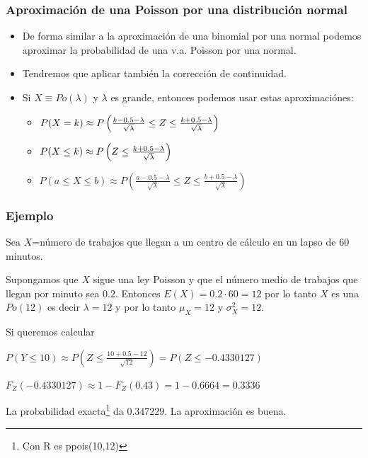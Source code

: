 \begin{frame}

\frametitle{Aproximación de una Poisson por una distribución normal}
\begin{itemize}
\item De forma similar a la aproximación de una binomial por una normal podemos aproximar la
probabilidad de una v.a. Poisson por una normal.
\item  Tendremos que aplicar también la corrección de continuidad.
\item Si $X\equiv Po(\lambda)$ y $\lambda$ es grande, entonces podemos usar
estas aproximaciónes:
\begin{itemize}
\item $ P(X=k) \approx P\left({{k-0.5-\lambda} \over
\sqrt{\lambda}}\leq Z \leq {{k+0.5-\lambda}\over \sqrt{\lambda}}\right)$
\item $P(X\leq k)\approx P\left(Z \leq
{{k+0.5-\lambda}\over \sqrt{\lambda}}\right)$
\item $P(a\leq X\leq b)\approx P\left(\frac{a-0.5-\lambda}{
\sqrt{\lambda}}\leq Z \leq \frac{b+0.5-\lambda}{ \sqrt{\lambda}}\right)$
\end{itemize}
\end{itemize}
\end{frame}

\begin{frame}
    \frametitle{Ejemplo}
    Sea $X$=número de trabajos que llegan a un centro de cálculo en
    un lapso de $60$ minutos.

    Supongamos que $X$ sigue una ley Poisson y que el número medio de
    trabajos que llegan por minuto sea $0.2$.
    Entonces $E(X)=0.2\cdot60=12$ por lo tanto $X$ es una $Po(12)$ es
    decir $\lambda =12$ y por lo tanto $\mu_X=12$ y $\sigma_X^2=12$.

    Si queremos calcular

    $P(Y\leq 10)\approx P(Z\leq \frac{10+0.5-12}{\sqrt{12}})=P(Z\leq -0.4330127)$

  $F_{Z}(-0.4330127)\approx 1-F_{Z}(0.43)=1-0.6664=0.3336$

La probabilidad exacta\footnote{Con R es  ppois(10,12) }  da $0.347229$. La aproximación es  buena.
\end{frame}

